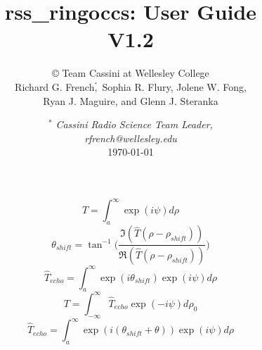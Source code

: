 \documentclass[titlepage, 12pt]{article}
\begin{document}
    \title{{\Huge{rss\_ringoccs: User Guide}\\}V1.2}
    \author{\copyright
            Team Cassini at Wellesley College\\
            Richard G. French$\overset{^*}{,}$
            Sophia R. Flury,
            Jolene W. Fong,\\
            Ryan J. Maguire, and
            Glenn J. Steranka}
    \date{%
        $^*$\textit{%
            \small{Cassini Radio Science Team Leader, \\
            rfrench@wellesley.edu}
        }\\[4ex]%
        \today%
    }
    \maketitle
    \newpage
    \tableofcontents
    \newpage
    \listoffigures
    \listoftables
    \clearpage
    \begin{equation}
        \hat{T}=\int_{a}^{\infty}\exp(i\psi)d\rho
    \end{equation}
    \begin{equation}
        \theta_{shift}=\tan^{-1}\Big(\frac{\Im(\hat{T}(\rho-\rho_{shift}))}{\Re(\hat{T}(\rho-\rho_{shift}))}\Big)
    \end{equation}
    \begin{equation}
        \hat{T}_{echo}=\int_{a}^{\infty}\exp(i\theta_{shift})\exp(i\psi)d\rho
    \end{equation}
    \begin{equation}
        T=\int_{-\infty}^{\infty}\hat{T}_{echo}\exp(-i\psi)d\rho_{0}
    \end{equation}
    \vspace{5ex}
    \begin{equation}
        \hat{T}_{echo}=\int_{a}^{\infty}\exp(i(\theta_{shift}+\theta))\exp(i\psi)d\rho
    \end{equation}
    \newpage
\end{document}

